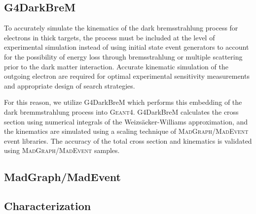 \subsection{G4DarkBreM}
To accurately simulate the kinematics of the dark bremsstrahlung process for electrons in thick targets, the process must be included at the level of experimental simulation instead of using initial state event generators to account for the possibility of energy loss through bremsstrahlung or multiple scattering prior to the dark matter interaction. Accurate kinematic simulation of the outgoing electron are required for optimal experimental sensitivity measurements and appropriate design of search strategies.

For this reason, we utilize G4DarkBreM \cite{g4darkbrem} which performs this embedding of the dark bremmstrahlung process into \textsc{Geant}4. G4DarkBreM calculates the cross section using numerical integrals of the Weizs\"{a}cker-Williams approximation, and the kinematics are simulated using a scaling technique of \textsc{MadGraph/MadEvent} event libraries. The accuracy of the total cross section and kinematics is validated using \textsc{MadGraph/MadEvent} samples.

\subsection{MadGraph/MadEvent}

\subsection{Characterization}

